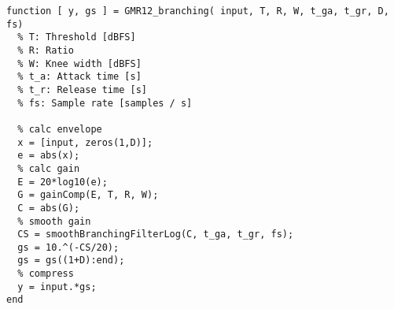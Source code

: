 \documentclass[../main2.tex]{subfiles}
\begin{document}

\begin{lstlisting}[style=customc]
function [ y, gs ] = GMR12_branching( input, T, R, W, t_ga, t_gr, D, fs)
  % T: Threshold [dBFS]
  % R: Ratio
  % W: Knee width [dBFS]
  % t_a: Attack time [s]
  % t_r: Release time [s]
  % fs: Sample rate [samples / s]
  
  % calc envelope
  x = [input, zeros(1,D)];
  e = abs(x);
  % calc gain
  E = 20*log10(e);
  G = gainComp(E, T, R, W);
  C = abs(G);
  % smooth gain
  CS = smoothBranchingFilterLog(C, t_ga, t_gr, fs);
  gs = 10.^(-CS/20);
  gs = gs((1+D):end);
  % compress
  y = input.*gs;
end
\end{lstlisting}
\end{document}

